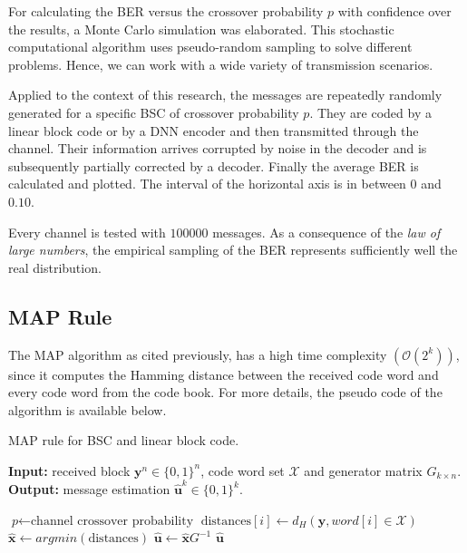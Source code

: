 \documentclass[conference]{IEEEtran}
\begin{document}
For calculating the BER versus the crossover probability $p$ with confidence over the results, a Monte Carlo simulation was elaborated. This stochastic computational algorithm uses pseudo-random sampling to solve different problems. Hence, we can work with a wide variety of transmission scenarios.

Applied to the context of this research, the messages are repeatedly randomly generated for a specific BSC of crossover probability $p$. They are coded by a linear block code or by a DNN encoder and then transmitted through the channel. Their information arrives corrupted by noise in the decoder and is subsequently partially corrected by a decoder. Finally the average BER is calculated and plotted. The interval of the horizontal axis is in between $0$ and $0.10$.

Every channel is tested with $100000$ messages. As a consequence of the \textit{law of large numbers}, the empirical sampling of the BER represents sufficiently well the real distribution. 

\subsection{MAP Rule}

The MAP algorithm as cited previously, has a high time complexity $(\mathcal{O}(2^k))$, since it computes the Hamming distance between the received code word and every code word from the code book. For more details, the pseudo code of the algorithm is available below.

\begin{algorithm}
\caption{MAP rule for BSC and linear block code.}\label{alg:MAP}
\hspace*{\algorithmicindent} \textbf{Input:} received block $\textbf{y}^n \in \{0,1\}^n$, code word set $\mathcal{X}$ and generator matrix $G_{k \times n}$. \\
\hspace*{\algorithmicindent} \textbf{Output:} message estimation $\hat{\textbf{u}}^k \in \{0,1\}^k$.
\begin{algorithmic}[H]
\State $\textit{p} \gets \text{channel crossover probability}$
\State $\text{distances}[i] \gets d_H(\textbf{y},word[i] \in \mathcal{X})$
\EndFor
\State $\hat{\textbf{x}} \gets argmin(\text{distances})$
\State $\hat{\textbf{u}} \gets \hat{\textbf{x}} G^{-1}$
\Return $\hat{\textbf{u}}$
\EndProcedure
\end{algorithmic}
\end{algorithm}
\end{document}
